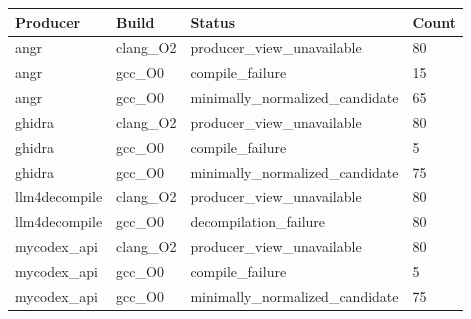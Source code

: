 \begin{tabular}{llll}
\toprule
Producer & Build & Status & Count \\
\midrule
angr & clang\_O2 & producer\_view\_unavailable & 80 \\
angr & gcc\_O0 & compile\_failure & 15 \\
angr & gcc\_O0 & minimally\_normalized\_candidate & 65 \\
ghidra & clang\_O2 & producer\_view\_unavailable & 80 \\
ghidra & gcc\_O0 & compile\_failure & 5 \\
ghidra & gcc\_O0 & minimally\_normalized\_candidate & 75 \\
llm4decompile & clang\_O2 & producer\_view\_unavailable & 80 \\
llm4decompile & gcc\_O0 & decompilation\_failure & 80 \\
mycodex\_api & clang\_O2 & producer\_view\_unavailable & 80 \\
mycodex\_api & gcc\_O0 & compile\_failure & 5 \\
mycodex\_api & gcc\_O0 & minimally\_normalized\_candidate & 75 \\
\bottomrule
\end{tabular}
